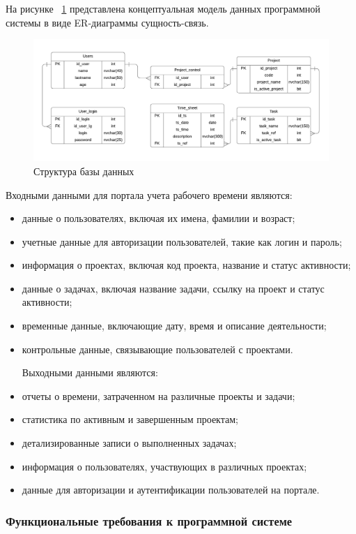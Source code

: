 На рисунке ~\ref{fig:erfdiagdb} представлена концептуальная модель данных программной системы в виде ER-диаграммы сущность-связь.

\begin{figure}[H]
	\centering
	\includegraphics[width=0.9\linewidth]{images/ERFDiagDB}
	\caption{Структура базы данных}
	\label{fig:erfdiagdb}
\end{figure}

Входными данными для портала учета рабочего времени являются:

\begin{itemize}

\item данные о пользователях, включая их имена, фамилии и возраст;
\item учетные данные для авторизации пользователей, такие как логин и пароль;
\item информация о проектах, включая код проекта, название и статус активности;
\item данные о задачах, включая название задачи, ссылку на проект и статус активности;
\item временные данные, включающие дату, время и описание деятельности;
\item контрольные данные, связывающие пользователей с проектами.

Выходными данными являются:

\item отчеты о времени, затраченном на различные проекты и задачи;
\item статистика по активным и завершенным проектам;
\item детализированные записи о выполненных задачах;
\item информация о пользователях, участвующих в различных проектах;
\item данные для авторизации и аутентификации пользователей на портале.
\end{itemize}

\subsubsection{Функциональные требования к программной системе}

